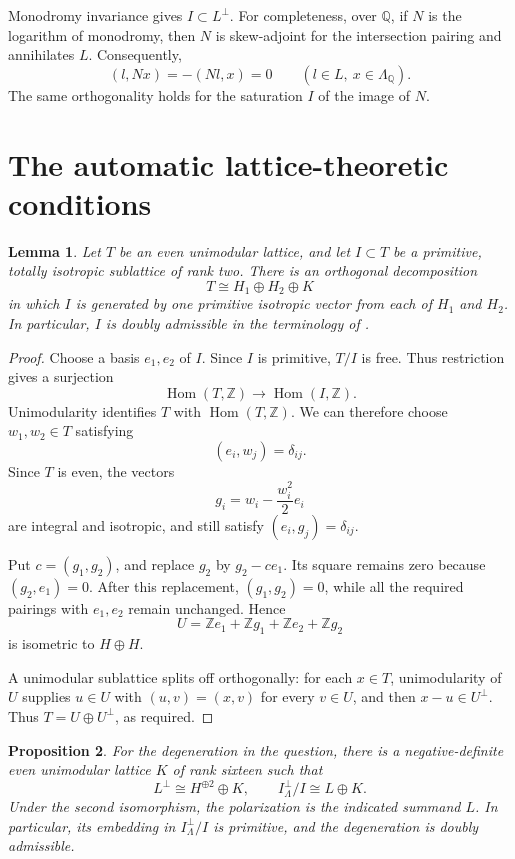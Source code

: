 \documentclass[11pt]{article}
\newcommand{\Z}{\mathbb Z}
\newcommand{\Q}{\mathbb Q}
\newtheorem{lemma}{Lemma}[section]
\newtheorem{proposition}[lemma]{Proposition}
\theoremstyle{remark}
\begin{document}
Monodromy invariance gives \(I\subset L^\perp\).
For completeness, over \(\Q\), if \(N\) is the logarithm of monodromy,
then \(N\) is skew-adjoint for the intersection pairing and annihilates
\(L\).  Consequently,
\[
 (l,Nx)=-(Nl,x)=0
 \qquad(l\in L,\ x\in\Lambda_\Q).
\]
The same orthogonality holds for the saturation \(I\) of the image of
\(N\).

\section{The automatic lattice-theoretic conditions}

\begin{lemma}\label{lem:split}
Let \(T\) be an even unimodular lattice, and let
\(I\subset T\) be a primitive, totally isotropic sublattice of rank two.
There is an orthogonal decomposition
\[
 T\cong H_1\oplus H_2\oplus K
\]
in which \(I\) is generated by one primitive isotropic vector from each
of \(H_1\) and \(H_2\).
In particular, \(I\) is doubly admissible in the terminology of
\cite[Definition~3.31]{GT24}.
\end{lemma}

\begin{proof}
Choose a basis \(e_1,e_2\) of \(I\).
Since \(I\) is primitive, \(T/I\) is free.  Thus restriction gives a
surjection
\[
 \operatorname{Hom}(T,\Z)\longrightarrow
 \operatorname{Hom}(I,\Z).
\]
Unimodularity identifies \(T\) with \(\operatorname{Hom}(T,\Z)\).
We can therefore choose \(w_1,w_2\in T\) satisfying
\[
 (e_i,w_j)=\delta_{ij}.
\]
Since \(T\) is even, the vectors
\[
 g_i=w_i-\frac{w_i^2}{2}e_i
\]
are integral and isotropic, and still satisfy
\((e_i,g_j)=\delta_{ij}\).

Put \(c=(g_1,g_2)\), and replace \(g_2\) by \(g_2-ce_1\).
Its square remains zero because \((g_2,e_1)=0\).
After this replacement, \((g_1,g_2)=0\), while all the required
pairings with \(e_1,e_2\) remain unchanged.  Hence
\[
 U=\Z e_1+\Z g_1+\Z e_2+\Z g_2
\]
is isometric to \(H\oplus H\).

A unimodular sublattice splits off orthogonally: for each \(x\in T\),
unimodularity of \(U\) supplies \(u\in U\) with
\((u,v)=(x,v)\) for every \(v\in U\), and then \(x-u\in U^\perp\).
Thus \(T=U\oplus U^\perp\), as required.
\end{proof}

\begin{proposition}\label{prop:degeneration}
For the degeneration in the question, there is a negative-definite
even unimodular lattice \(K\) of rank sixteen such that
\[
 L^\perp\cong H^{\oplus2}\oplus K,
 \qquad
 I^\perp_\Lambda/I\cong L\oplus K.
\]
Under the second isomorphism, the polarization is the indicated
summand \(L\).  In particular, its embedding in \(I^\perp_\Lambda/I\)
is primitive, and the degeneration is doubly admissible.
\end{proposition}
\end{document}
